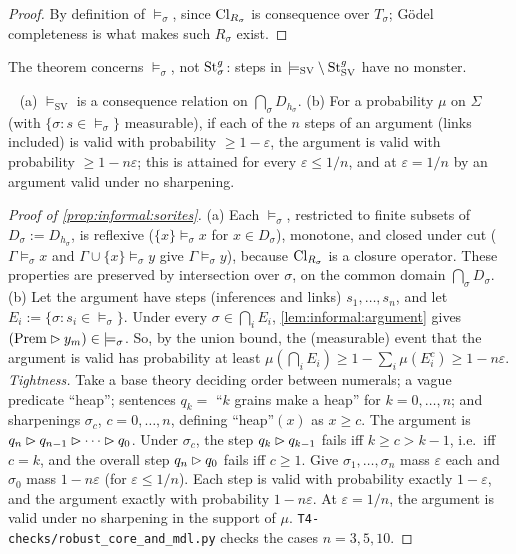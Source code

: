\begin{proof}
By definition of ${\models_\sigma}$, since $\mathrm{Cl}_{R_\sigma}$ is consequence over $T_\sigma$; Gödel completeness is what makes such $R_\sigma$ exist.
\end{proof}

The theorem concerns ${\models_\sigma}$, not $\mathrm{St}^{g}_{\sigma}$: steps in ${\models_{\mathrm{SV}}}\setminus\mathrm{St}^{g}_{\mathrm{SV}}$ have no monster.

\begin{proposition}\ \label{prop:informal:sorites}
(a) ${\models_{\mathrm{SV}}}$ is a consequence relation on $\bigcap_\sigma D_{h_\sigma}$. (b) For a probability $\mu$ on $\Sigma$ (with $\{\sigma:s\in{\models_\sigma}\}$ measurable), if each of the $n$ steps of an argument (links included) is valid with probability $\ge1-\varepsilon$, the argument is valid with probability $\ge1-n\varepsilon$; this is attained for every $\varepsilon\le1/n$, and at $\varepsilon=1/n$ by an argument valid under no sharpening.
\end{proposition}

\begin{proof}[Proof of \cref{prop:informal:sorites}]
(a) Each ${\models_\sigma}$, restricted to finite subsets of $D_\sigma:=D_{h_\sigma}$, is reflexive ($\{x\}\models_\sigma x$ for $x\in D_\sigma$), monotone, and closed under cut ($\Gamma\models_\sigma x$ and $\Gamma\cup\{x\}\models_\sigma y$ give $\Gamma\models_\sigma y$), because $\mathrm{Cl}_{R_\sigma}$ is a closure operator. These properties are preserved by intersection over $\sigma$, on the common domain $\bigcap_\sigma D_\sigma$.
(b) Let the argument have steps (inferences and links) $s_1,\dots,s_n$, and let $E_i:=\{\sigma:s_i\in{\models_\sigma}\}$. Under every $\sigma\in\bigcap_iE_i$, \cref{lem:informal:argument} gives $(\mathrm{Prem}\rhd y_m)\in{\models_\sigma}$. So, by the union bound, the (measurable) event that the argument is valid has probability at least $\mu(\bigcap_iE_i)\ge1-\sum_i\mu(E_i^c)\ge1-n\varepsilon$.
\emph{Tightness.} Take a base theory deciding order between numerals; a vague predicate ``heap''; sentences $q_k=$ ``$k$ grains make a heap'' for $k=0,\dots,n$; and sharpenings $\sigma_c$, $c=0,\dots,n$, defining ``heap''$(x)$ as $x\ge c$. The argument is $q_n\rhd q_{n-1}\rhd\cdots\rhd q_0$. Under $\sigma_c$, the step $q_k\rhd q_{k-1}$ fails iff $k\ge c>k-1$, i.e.\ iff $c=k$, and the overall step $q_n\rhd q_0$ fails iff $c\ge1$. Give $\sigma_1,\dots,\sigma_n$ mass $\varepsilon$ each and $\sigma_0$ mass $1-n\varepsilon$ (for $\varepsilon\le1/n$). Each step is valid with probability exactly $1-\varepsilon$, and the argument exactly with probability $1-n\varepsilon$. At $\varepsilon=1/n$, the argument is valid under no sharpening in the support of $\mu$. \texttt{T4-checks/robust\_core\_and\_mdl.py} checks the cases $n=3,5,10$.
\end{proof}

